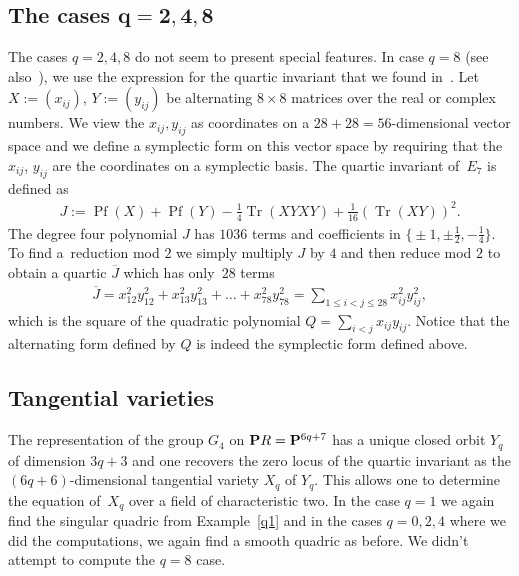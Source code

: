\documentclass[pdftex]{sigma}
\newcommand{\PP}{{\bf P}}
\numberwithin{equation}{section}
\begin{document}
\subsection[The cases $q=2,4,8$]{The cases $\boldsymbol{q=2,4,8}$}\label{q8}
The cases $q=2,4,8$ do not seem to present special features. In case $q=8$ (see also~\cite{wilson}), we use the expression for the quartic invariant that we found in~\cite{freudenthal}. Let $X:=(x_{ij})$, $Y:=(y_{ij})$ be alternating $8\times 8$ matrices over the real or complex numbers. We view the $x_{ij},y_{ij}$ as coordinates on a $28+28=56$-dimensional vector space and we define a symplectic form on this vector space by requiring that the $x_{ij}$, $y_{ij}$ are the coordinates on a symplectic basis. The quartic invariant of~$E_7$ is defined as
\begin{gather*}
J := \operatorname{Pf}(X) + \operatorname{Pf}(Y) - \tfrac{1}{4} \operatorname{Tr}(XYXY) + \tfrac{1}{16} (\operatorname{Tr}(XY))^2.
\end{gather*}
The degree four polynomial $J$ has $1036$ terms and coefficients in $\big\{{\pm}1, \pm \frac{1}{2}, - \frac{1}{4} \big\}$. To find a~reduction mod $2$ we simply multiply $J$ by $4$ and then reduce mod $2$ to obtain a quartic $\overline{J}$ which has only~$28$ terms
\begin{gather*}
\overline{J} = x_{12}^2y_{12}^2 + x_{13}^2y_{13}^2 + \dots + x_{78}^2y_{78}^2 = \sum_{1\leq i<j\leq 28} x_{ij}^2y_{ij}^2,
\end{gather*}
which is the square of the quadratic polynomial $Q=\sum\limits_{i<j} x_{ij}y_{ij}$. Notice that the alternating form defined by $Q$ is indeed the symplectic form defined above.

\subsection{Tangential varieties}\label{tgv}
The representation of the group $G_4$ on $\PP R=\PP^{6q+7}$ has a unique closed orbit $Y_q$ of dimension $3q+3$ and one recovers the zero locus of the quartic invariant
as the $(6q+6)$-dimensional tangential variety $X_q$ of $Y_q$. This allows one to determine the equation of~$X_q$ over a field of characteristic two. In the case $q=1$ we again find the singular quadric from Example~\ref{q1} and in the cases $q=0,2,4$ where we did the computations, we again find a smooth quadric as before. We didn't attempt to compute the $q=8$ case.
\end{document}
